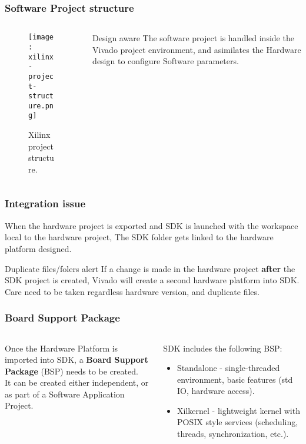 \begin{frame}
	\frametitle{Software Project structure}
	\begin{columns}
		\begin{column}{0.5\textwidth}
			\begin{figure}
				\texttt{[image: xilinx-project-structure.png]}
				\caption{Xilinx project structure.}\label{fig:xilinx-project-structure}
			\end{figure}
		\end{column} \pause
		\begin{column}{0.5\textwidth}
			\begin{block}{Design aware}
				The software project is handled inside the Vivado project environment, and asimilates the Hardware design to configure Software parameters.
			\end{block}
		\end{column}
	\end{columns}
\end{frame}

\begin{frame}
	\frametitle{Integration issue}
	When the hardware project is exported and SDK is launched with the workspace local to the hardware project, The SDK folder gets linked to the hardware platform designed.
	\vfill \pause
	\begin{alertblock}{Duplicate files/folers alert}
		If a change is made in the hardware project \textbf{after} the SDK project is created, Vivado will create a second hardware platform into SDK. Care need to be taken regardless hardware version, and duplicate files.
	\end{alertblock}
\end{frame}

\begin{frame}
	\frametitle{Board Support Package}
	\begin{columns}
		\begin{column}{0.5\textwidth}
			Once the Hardware Platform is imported into SDK, a \textbf{Board Support Package} (BSP) needs to be created. \\
			\vspace{1.5 em}
			It can be created either independent, or as part of a Software Application Project.
		\end{column} \pause
		\begin{column}{0.5\textwidth}
			SDK includes the following BSP:
			\begin{itemize}
				\item Standalone - single-threaded environment, basic features (std IO, hardware access).
				\item Xilkernel - lightweight kernel with POSIX style services (scheduling, threads, synchronization, etc.).
			\end{itemize}
		\end{column}
	\end{columns}
\end{frame}


